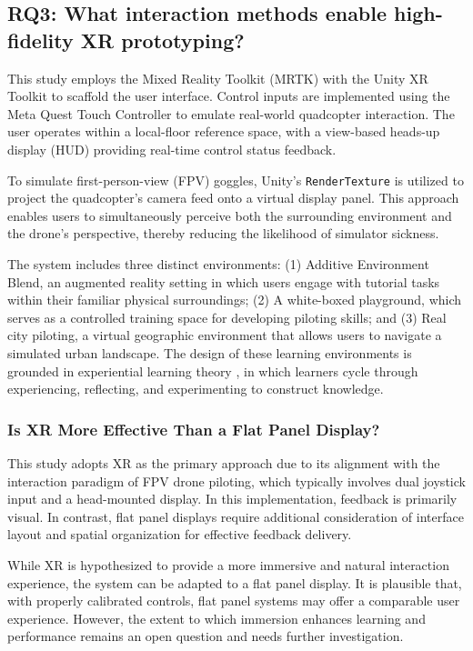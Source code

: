 \subsection{RQ3: What interaction methods enable high-fidelity XR prototyping?}

This study employs the Mixed Reality Toolkit (MRTK) with the Unity XR Toolkit to scaffold the user interface. Control inputs are implemented using the Meta Quest Touch Controller to emulate real-world quadcopter interaction. The user operates within a local-floor reference space, with a view-based heads-up display (HUD) providing real-time control status feedback.

To simulate first-person-view (FPV) goggles, Unity's \texttt{RenderTexture} is utilized to project the quadcopter's camera feed onto a virtual display panel. This approach enables users to simultaneously perceive both the surrounding environment and the drone's perspective, thereby reducing the likelihood of simulator sickness.

The system includes three distinct environments: (1) Additive Environment Blend, an augmented reality setting in which users engage with tutorial tasks within their familiar physical surroundings; (2) A white-boxed playground, which serves as a controlled training space for developing piloting skills; and (3) Real city piloting, a virtual geographic environment that allows users to navigate a simulated urban landscape. The design of these learning environments is grounded in experiential learning theory \parencite{kolb1984}, in which learners cycle through experiencing, reflecting, and experimenting to construct knowledge.

\subsubsection{Is XR More Effective Than a Flat Panel Display?}

This study adopts XR as the primary approach due to its alignment with the interaction paradigm of FPV drone piloting, which typically involves dual joystick input and a head-mounted display. In this implementation, feedback is primarily visual. In contrast, flat panel displays require additional consideration of interface layout and spatial organization for effective feedback delivery.

While XR is hypothesized to provide a more immersive and natural interaction experience, the system can be adapted to a flat panel display. It is plausible that, with properly calibrated controls, flat panel systems may offer a comparable user experience. However, the extent to which immersion enhances learning and performance remains an open question and needs further investigation.